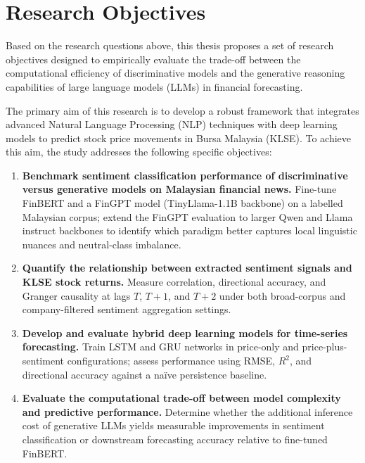 \documentclass[12pt]{ucetd}
\begin{document}
\section{Research Objectives}

Based on the research questions above, this thesis proposes a set of research objectives designed to empirically evaluate the trade-off between the computational efficiency of discriminative models and the generative reasoning capabilities of large language models (LLMs) in financial forecasting.

The primary aim of this research is to develop a robust framework that integrates advanced Natural Language Processing (NLP) techniques with deep learning models to predict stock price movements in Bursa Malaysia (KLSE). To achieve this aim, the study addresses the following specific objectives:

\begin{enumerate}
    \item \textbf{Benchmark sentiment classification performance of discriminative versus generative models on Malaysian financial news.} Fine-tune FinBERT and a FinGPT model (TinyLlama-1.1B backbone) on a labelled Malaysian corpus; extend the FinGPT evaluation to larger Qwen and Llama instruct backbones to identify which paradigm better captures local linguistic nuances and neutral-class imbalance.

    \item \textbf{Quantify the relationship between extracted sentiment signals and KLSE stock returns.} Measure correlation, directional accuracy, and Granger causality at lags $T$, $T{+}1$, and $T{+}2$ under both broad-corpus and company-filtered sentiment aggregation settings.

    \item \textbf{Develop and evaluate hybrid deep learning models for time-series forecasting.} Train LSTM and GRU networks in price-only and price-plus-sentiment configurations; assess performance using RMSE, $R^2$, and directional accuracy against a na\"ive persistence baseline.

    \item \textbf{Evaluate the computational trade-off between model complexity and predictive performance.} Determine whether the additional inference cost of generative LLMs yields measurable improvements in sentiment classification or downstream forecasting accuracy relative to fine-tuned FinBERT.
\end{enumerate}
\end{document}
